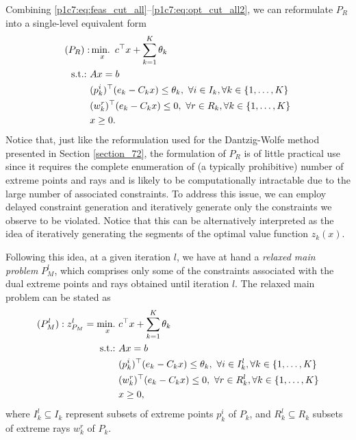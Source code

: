 Combining \eqref{p1c7:eq:feas_cut_all}--\eqref{p1c7:eq:opt_cut_all2}, we can reformulate $P_R$ into a single-level equivalent form 
%
\begin{align}
	(P_R) : & \mathop{\text{min.~}}_x c^\top x + \sum_{k=1}^K\theta_k \nonumber\\
	\mathop{\text{s.t.:~}}   & Ax = b \nonumber \\
		  & (p^i_k)^\top (e_k - C_k x) \leq  \theta_k, \ \forall i \in I_k, \forall k \in \left\{ 1,\dots, K \right \}  \label{p1c7:eq:opt_cut} \\
		  & 	(w^r_k)^\top (e_k - C_k x) \leq 0, \ \forall r \in R_k, \forall k \in \left\{ 1, \dots, K \right \} \label{p1c7:eq:feas_cut} \\
	      & x \geq 0. \nonumber
\end{align}
%
Notice that, just like the reformulation used for the Dantzig-Wolfe method presented in Section \ref{section_72}, the formulation of $P_R$ is of little practical use since it requires the complete enumeration of (a typically prohibitive) number of extreme points and rays and is likely to be computationally intractable due to the large number of associated constraints. To address this issue, we can employ delayed constraint generation and iteratively generate only the constraints we observe to be violated. Notice that this can be alternatively interpreted as the idea of iteratively generating the segments of the optimal value function $z_k(x)$.

Following this idea, at a given iteration $l$, we have at hand a \emph{relaxed main problem} $P_M^l$, which comprises only some of the constraints associated with the dual extreme points and rays obtained until iteration $l$. The relaxed main problem can be stated as
%
\begin{align*}
	(P^l_M) : z_{P_M}^l = \mathop{\text{min.~}}_x & c^\top x + \sum_{k=1}^K\theta_k \\
	\mathop{\text{s.t.:~}}   & Ax = b \nonumber \\
		  & (p^i_k)^\top (e_k - C_k x) \leq  \theta_k, \ \forall i \in I_k^l, \forall k \in \left\{ 1, \dots, K \right \}  \\
		  & (w^r_k)^\top (e_k - C_k x) \leq 0, \ \forall r \in R_k^l, \forall k \in \left\{ 1, \dots, K \right \}  \\
	      & x \geq 0, 
\end{align*}
%
where $I_k^l \subseteq I_k$ represent subsets of extreme points $p^i_k$ of $P_k$, and $R^l_k \subseteq R_k$ subsets of extreme rays $w^r_k$ of $P_k$.

